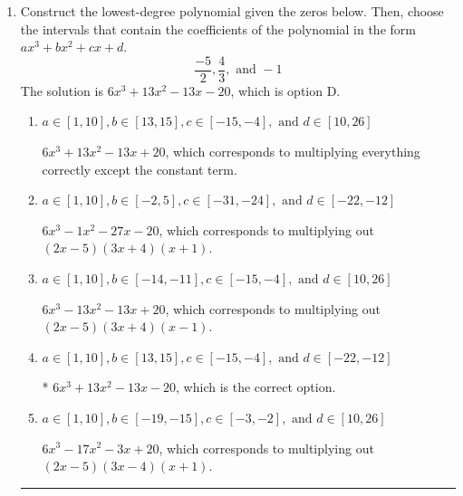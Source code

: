 \documentclass{extbook}[14pt]
\newcommand{\litem}[1]{\item #1

\rule{\textwidth}{0.4pt}}
\begin{document}
\begin{enumerate}\litem{
Construct the lowest-degree polynomial given the zeros below. Then, choose the intervals that contain the coefficients of the polynomial in the form $ax^3+bx^2+cx+d$.
\[ \frac{-5}{2}, \frac{4}{3}, \text{ and } -1 \]The solution is \( 6x^{3} +13 x^{2} -13 x -20 \), which is option D.\begin{enumerate}[label=\Alph*.]
\item \( a \in [1, 10], b \in [13, 15], c \in [-15, -4], \text{ and } d \in [10, 26] \)

$6x^{3} +13 x^{2} -13 x + 20$, which corresponds to multiplying everything correctly except the constant term.
\item \( a \in [1, 10], b \in [-2, 5], c \in [-31, -24], \text{ and } d \in [-22, -12] \)

$6x^{3} -1 x^{2} -27 x -20$, which corresponds to multiplying out $(2x -5)(3x + 4)(x + 1)$.
\item \( a \in [1, 10], b \in [-14, -11], c \in [-15, -4], \text{ and } d \in [10, 26] \)

$6x^{3} -13 x^{2} -13 x + 20$, which corresponds to multiplying out $(2x -5)(3x + 4)(x -1)$.
\item \( a \in [1, 10], b \in [13, 15], c \in [-15, -4], \text{ and } d \in [-22, -12] \)

* $6x^{3} +13 x^{2} -13 x -20$, which is the correct option.
\item \( a \in [1, 10], b \in [-19, -15], c \in [-3, -2], \text{ and } d \in [10, 26] \)

$6x^{3} -17 x^{2} -3 x + 20$, which corresponds to multiplying out $(2x -5)(3x -4)(x + 1)$.
\end{enumerate}

}
\end{enumerate}
\end{document}
